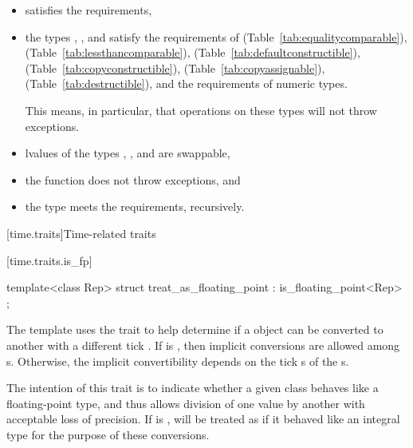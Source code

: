 \begin{itemize}
\item {} satisfies the  requirements,

\item the types , , and 
satisfy the requirements of  (Table~\ref{tab:equalitycomparable}),
 (Table~\ref{tab:lessthancomparable}),
 (Table~\ref{tab:defaultconstructible}),
 (Table~\ref{tab:copyconstructible}),
 (Table~\ref{tab:copyassignable}),
 (Table~\ref{tab:destructible}), and the requirements of
numeric types. \begin{note} This means, in particular,
that operations on these types will not throw exceptions. \end{note}

\item lvalues of the types , , and
 are swappable,

\item the function  does not throw exceptions, and

\item the type  meets the 
requirements, recursively.
\end{itemize}

[time.traits]{Time-related traits}

[time.traits.is_fp]{}

%
\begin{itemdecl}
template<class Rep> struct treat_as_floating_point : is_floating_point<Rep> { };
\end{itemdecl}

\pnum
The  template uses the  trait to
help determine if a  object can be converted to another
 with a different tick . If
 is , then implicit conversions
are allowed among s. Otherwise, the implicit convertibility
depends on the tick s of the s.
\begin{note}
The intention of this trait is to indicate whether a given class behaves like a floating-point
type, and thus allows division of one value by another with acceptable loss of precision. If
 is ,  will be treated as
if it behaved like an integral type for the purpose of these conversions.
\end{note}

